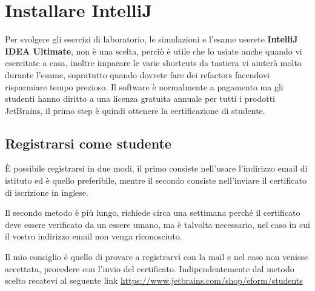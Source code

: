 \section{Installare IntelliJ}
    Per svolgere gli esercizi di laboratorio, le simulazioni e l'esame userete \textbf{IntelliJ IDEA Ultimate}, non è una scelta, perciò è utile che lo usiate anche 
    quando vi esercitate a casa, inoltre imparare le varie shortcuts da tastiera vi aiuterà molto durante l'esame, sopratutto quando dovrete fare dei refactors facendovi 
    risparmiare tempo prezioso.
    Il software è normalmente a pagamento ma gli studenti hanno diritto a una licenza gratuita annuale per tutti i prodotti JetBrains, il primo step è quindi ottenere la 
    certificazione di studente.
    \subsection{Registrarsi come studente}
        È possibile registrarsi in due modi, il primo consiste nell'usare l'indirizzo email di istituto ed è quello preferibile, mentre il secondo consiste nell'inviare il certificato
        di iscrizione in inglese.
        \begin{warningbox}
            Il secondo metodo è più lungo, richiede circa una settimana perché il certificato deve essere verificato da un essere umano, ma è talvolta necessario, nel caso 
            in cui il vostro indirizzo email non venga riconosciuto.
        \end{warningbox}
        Il mio consiglio è quello di provare a registrarvi con la mail e nel caso non venisse accettata, procedere con l'invio del certificato. Indipendentemente dal metodo scelto 
        recatevi al seguente link \url{https://www.jetbrains.com/shop/eform/students}
        

